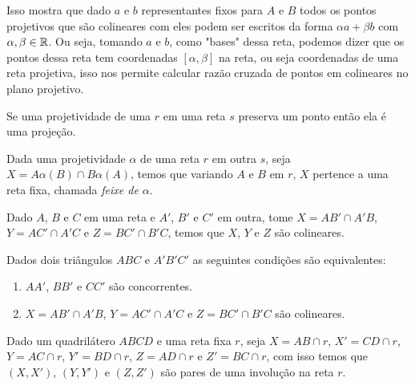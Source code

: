 Isso mostra que dado $a$ e $b$ representantes fixos para $A$ e $B$ todos os pontos projetivos que são colineares com eles podem ser escritos da forma $\alpha a + \beta b$ com $\alpha,\beta \in \mathbb{R}$. Ou seja, tomando $a$ e $b$, como "bases" dessa reta, podemos dizer que os pontos dessa reta tem coordenadas $[\alpha,\beta]$ na reta, ou seja coordenadas de uma reta projetiva, isso nos permite calcular razão cruzada de pontos em colineares no plano projetivo.

\begin{lem}
Se uma projetividade de uma $r$ em uma reta $s$ preserva um ponto então ela é uma projeção.
\end{lem}

\begin{thm}
Dada uma projetividade $\alpha$ de uma reta $r$ em outra $s$, seja $X = A\alpha(B) \cap B\alpha(A)$, temos que variando $A$ e $B$ em $r$, $X$ pertence a uma reta fixa, chamada \emph{feixe de $\alpha$}.
\end{thm}

\begin{cor}
Dado $A$, $B$ e $C$ em uma reta e $A'$, $B'$ e $C'$ em outra, tome $X = AB' \cap A'B$, $Y = AC'\cap A'C$ e $Z = BC' \cap B'C$, temos que $X$, $Y$ e $Z$ são colineares.
\end{cor}

\begin{thm}
Dados dois triângulos $ABC$ e $A'B'C'$ as seguintes condições são equivalentes:
\begin{enumerate}
    \item $AA'$, $BB'$ e $CC'$ são concorrentes.
    \item $X = AB' \cap A'B$, $Y = AC'\cap A'C$ e $Z = BC' \cap B'C$ são colineares.
\end{enumerate}
\end{thm}

\begin{thm}
Dado um quadrilátero $ABCD$ e uma reta fixa $r$, seja $X = AB \cap r$, $X' = CD \cap r$, $Y = AC \cap r$, $Y' = BD \cap r$, $Z = AD \cap r$ e $Z' = BC \cap r$, com isso temos que $(X,X')$, $(Y,Y')$ e $(Z,Z')$ são pares de uma involução na reta $r$.
    
\end{thm}